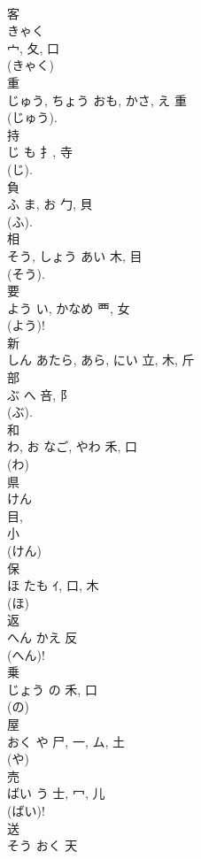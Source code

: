 \documentclass[8pt]{extreport}
\begin{document}
\begin{CJK}{UTF8}{min}
\\	客	
\\	きゃく	
\\	宀, 夂, 口	
\\	(きゃく) 
\\	重	
\\	じゅう, ちょう	おも, かさ, え	重	
\\	(じゅう). 
\\	持	
\\	じ	も	扌, 寺	
\\	(じ). 
\\	負	
\\	ふ	ま, お	勹, 貝	
\\	(ふ). 
\\	相	
\\	そう, しょう	あい	木, 目	
\\	(そう). 
\\	要	
\\	よう	い, かなめ	覀, 女	
\\	(よう)! 
\\	新	
\\	しん	あたら, あら, にい	立, 木, 斤	
\\	部	
\\	ぶ	へ	咅, 阝	
\\	(ぶ). 
\\	和	
\\	わ, お	なご, やわ	禾, 口	
\\	(わ) 
\\	県	
\\	けん	
\\	目, 
\\	小	
\\	(けん) 
\\	保	
\\	ほ	たも	ｲ, 口, 木	
\\	(ほ) 
\\	返	
\\	へん	かえ	反		
\\	(へん)!	
\\	乗	
\\	じょう	の	禾, 口	
\\	(の) 
\\	屋	
\\	おく	や	尸, 一, ム, 土	
\\	(や) 
\\	売	
\\	ばい	う	士, 冖, 儿	
\\	(ばい)!
\\	送	
\\	そう	おく	天	

\end{CJK}
\end{document}
